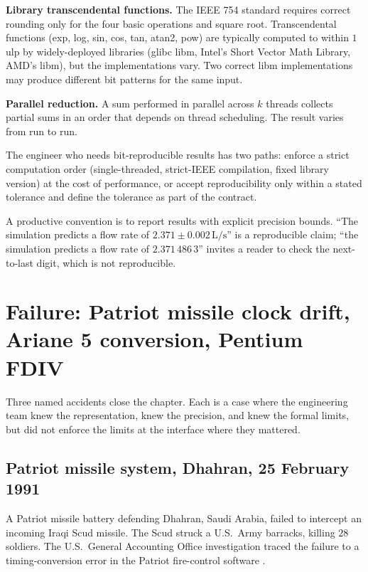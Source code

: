 \textbf{Library transcendental functions.} The IEEE 754 standard requires correct rounding only for the four basic operations and square root. Transcendental functions (exp, log, sin, cos, tan, atan2, pow) are typically computed to within $1$ ulp by widely-deployed libraries (glibc libm, Intel's Short Vector Math Library, AMD's libm), but the implementations vary. Two correct libm implementations may produce different bit patterns for the same input.

\textbf{Parallel reduction.} A sum performed in parallel across $k$ threads collects partial sums in an order that depends on thread scheduling. The result varies from run to run.

The engineer who needs bit-reproducible results has two paths: enforce a strict computation order (single-threaded, strict-IEEE compilation, fixed library version) at the cost of performance, or accept reproducibility only within a stated tolerance and define the tolerance as part of the contract.

A productive convention is to report results with explicit precision bounds. ``The simulation predicts a flow rate of $2.371 \pm 0.002\,\si{\liter\per\second}$'' is a reproducible claim; ``the simulation predicts a flow rate of $2.371\,486\,3$'' invites a reader to check the next-to-last digit, which is not reproducible.

\section{Failure: Patriot missile clock drift, Ariane 5 conversion, Pentium FDIV}

Three named accidents close the chapter. Each is a case where the engineering team knew the representation, knew the precision, and knew the formal limits, but did not enforce the limits at the interface where they mattered.

\subsection{Patriot missile system, Dhahran, 25 February 1991}

A Patriot missile battery defending Dhahran, Saudi Arabia, failed to intercept an incoming Iraqi Scud missile. The Scud struck a U.S.\ Army barracks, killing $28$ soldiers. The U.S.\ General Accounting Office investigation traced the failure to a timing-conversion error in the Patriot fire-control software \cite{acc:gao-patriot-1992}.

